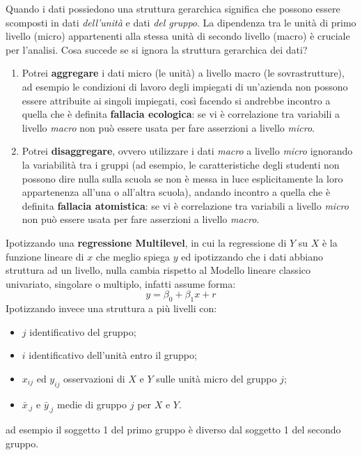 \documentclass[a4page, 11pt]{article} %
\begin{document}
Quando i dati possiedono una struttura gerarchica significa che possono essere scomposti in dati \textit{dell'unità} e dati \textit{del gruppo}. La dipendenza tra le unità di primo livello (micro) appartenenti alla stessa unità di secondo livello (macro) è cruciale per l’analisi.
\newline
Cosa succede se si ignora la struttura gerarchica dei dati?
\begin{enumerate}[noitemsep]
\item Potrei \textbf{aggregare} i dati micro (le unità) a livello macro (le sovrastrutture), ad esempio le condizioni di lavoro degli impiegati di un'azienda non possono essere attribuite ai singoli impiegati, così facendo si andrebbe incontro a quella che è definita \textbf{fallacia ecologica}: se vi è correlazione tra variabili a livello \textit{macro} non può essere usata per fare asserzioni a livello \textit{micro}.
\item Potrei \textbf{disaggregare}, ovvero utilizzare i dati \textit{macro} a livello \textit{micro} ignorando la variabilità tra i gruppi (ad esempio, le caratteristiche degli studenti non possono dire nulla sulla scuola se non è messa in luce esplicitamente la loro appartenenza all'una o all'altra scuola), andando incontro a quella che è definita \textbf{fallacia atomistica}: se vi è correlazione tra variabili a livello \textit{micro} non può essere usata per fare asserzioni a livello \textit{macro}.
\end{enumerate}
Ipotizzando una \textbf{regressione Multilevel}, in cui la regressione di $Y$ su $X$ è la funzione lineare di $x$ che meglio spiega $y$ ed ipotizzando che i dati abbiano struttura ad un livello, nulla cambia rispetto al Modello lineare classico univariato, singolare o multiplo, infatti assume forma:
\begin{equation*}
y = \beta_0 + \beta_1 x + r
\end{equation*}
Ipotizzando invece una struttura a più livelli con:
\begin{itemize}
\item $j$ identificativo del gruppo;
\item $i$ identificativo dell'unità entro il gruppo;
\item $x_{ij}$ ed $y_{ij}$ osservazioni di $X$ e $Y$ sulle unità micro del gruppo $j$;
\item $\bar{x}_{.j}$ e $\bar{y}_{.j}$ medie di gruppo $j$ per $X$ e $Y$.
\end{itemize}
ad esempio il soggetto 1 del primo gruppo è diverso dal soggetto 1 del secondo gruppo. \\
\end{document}
